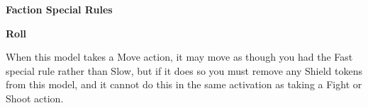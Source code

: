\documentclass{article}
\begin{document}
\vspace{0.6cm}

{\large \textbf{Faction Special Rules}}
\vspace{0.3cm}
\begin{multicols}{2}
    {\scriptsize

    \begin{minipage}{9cm}
        {\normalsize \textbf{Roll}}
        \vspace{0.3cm}

        When this model takes a Move action, it may move as though
        you had the Fast special rule rather than Slow, but if it does
        so you must remove any Shield tokens from this model, and it
        cannot do this in the same activation as taking a Fight or
        Shoot action.
    \end{minipage}

    }
\end{multicols}
\end{document}
